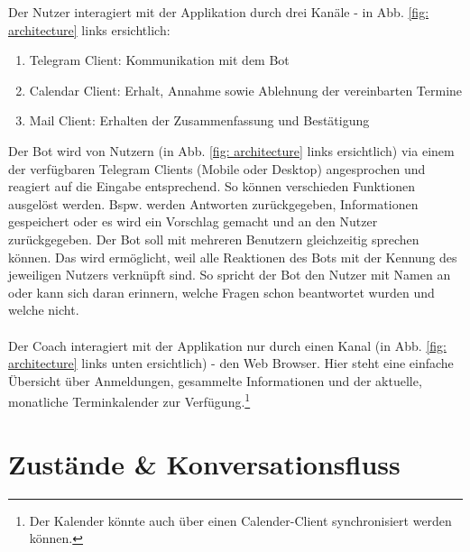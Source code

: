 	Der Nutzer interagiert mit der Applikation durch drei Kanäle - in Abb. \ref{fig: architecture} links ersichtlich:
	\begin{enumerate}
		\item Telegram Client: Kommunikation mit dem Bot
		\item Calendar Client: Erhalt, Annahme sowie Ablehnung der vereinbarten Termine
		\item Mail Client: Erhalten der Zusammenfassung und Bestätigung
	\end{enumerate}
	
	Der Bot wird von Nutzern (in Abb. \ref{fig: architecture} links ersichtlich) via einem der verfügbaren Telegram Clients (Mobile oder Desktop) angesprochen und reagiert auf die Eingabe entsprechend. So können verschieden Funktionen ausgelöst werden. Bspw. werden Antworten zurückgegeben, Informationen gespeichert oder es wird ein Vorschlag gemacht und an den Nutzer zurückgegeben. Der Bot soll mit mehreren Benutzern gleichzeitig sprechen können. Das wird ermöglicht, weil alle Reaktionen des Bots mit der Kennung des jeweiligen Nutzers verknüpft sind. So spricht der Bot den Nutzer mit Namen an oder kann sich daran erinnern, welche Fragen schon beantwortet wurden und welche nicht. \\ \\
	
	Der Coach interagiert mit der Applikation nur durch einen Kanal (in Abb. \ref{fig: architecture} links unten ersichtlich) - den Web Browser. Hier steht eine einfache Übersicht über Anmeldungen, gesammelte Informationen und der aktuelle, monatliche Terminkalender zur Verfügung.\footnote{Der Kalender könnte auch über einen Calender-Client synchronisiert werden können.}

\section{Zustände \& Konversationsfluss}

